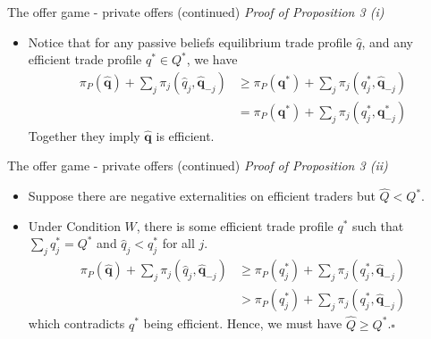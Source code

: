 \documentclass[aspectratio=169]{beamer}  %
\begin{document}
\begin{frame}{The offer game - private offers (continued)}
    \textit{Proof of Proposition 3 (i)} \vspace{.2cm}
    \begin{itemize}
        \item Notice that for any passive beliefs equilibrium trade profile $\hat{q}$, and any efficient trade profile $q^*\in Q^*$, we have
        \begin{equation}
            \begin{aligned}
                \pi_P(\hat{\mathbf{q}}) + \sum_j \pi_j(\hat{q}_j,\hat{\mathbf{q}}_{-j}) & \geq \pi_P(\mathbf{q}^*) + \sum_j \pi_j(q_j^*,\hat{\mathbf{q}}_{-j})\\
                & = \pi_P(\mathbf{q}^*) + \sum_j \pi_j(q_j^*, \mathbf{q}^*_{-j})
            \end{aligned}    
        \end{equation}
        Together they imply $\hat{\mathbf{q}}$ is efficient. \vspace{.2cm}
    \end{itemize}
\end{frame}



\begin{frame}{The offer game - private offers (continued)}
    \textit{Proof of Proposition 3 (ii)} \vspace{.2cm}
    \begin{itemize}
        \item Suppose there are negative externalities on efficient traders but $\hat{Q}<Q^*$. \vspace{.2cm}
        \item Under Condition $W$, there is some efficient trade profile $q^*$ such that $\sum_j q^*_j = Q^*$ and $\hat{q}_j<q_j^*$ for all $j$. \vspace{.2cm}
        \begin{equation*}
            \begin{aligned}
                \pi_P(\hat{\mathbf{q}}) + \sum_j \pi_j(\hat{q}_j, \hat{\mathbf{q}}_{-j}) & \geq \pi_P(q_j^*) + \sum_j \pi_j(q_j^*, \hat{\mathbf{q}}_{-j})  \\
                & > \pi_P(q_j^*) + \sum_j \pi_j(q_j^*, \hat{\mathbf{q}}_{-j})
            \end{aligned}
        \end{equation*}
        which contradicts $q^*$ being efficient. Hence, we must have $\hat{Q}\geq Q^*$.\hfill$\square$
    \end{itemize}
\end{frame}
\end{document}
